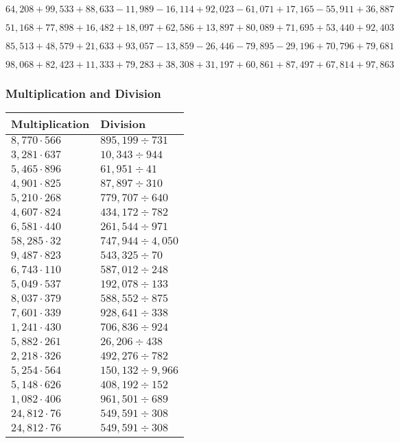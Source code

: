 \(64,208+99,533+88,633-11,989-16,114+92,023-61,071+17,165-55,911+36,887\)

\(51,168+77,898+16,482+18,097+62,586+13,897+80,089+71,695+53,440+92,403\)

\(85,513+48,579+21,633+93,057-13,859-26,446-79,895-29,196+70,796+79,681\)

\(98,068+82,423+11,333+79,283+38,308+31,197+60,861+87,497+67,814+97,863\)

\hypertarget{multiplication-and-division-1}{%
\subsubsection{Multiplication and
Division}\label{multiplication-and-division-1}}

\begin{longtable}[]{@{}ll@{}}
\toprule
Multiplication & Division\tabularnewline
\midrule
\endhead
\(8,770\cdot566\) & \(895,199÷731\)\tabularnewline
\(3,281\cdot637\) & \(10,343÷944\)\tabularnewline
\(5,465\cdot896\) & \(61,951÷41\)\tabularnewline
\(4,901\cdot825\) & \(87,897÷310\)\tabularnewline
\(5,210\cdot268\) & \(779,707÷640\)\tabularnewline
\(4,607\cdot824\) & \(434,172÷782\)\tabularnewline
\(6,581\cdot440\) & \(261,544÷971\)\tabularnewline
\(58,285\cdot32\) & \(747,944÷4,050\)\tabularnewline
\(9,487\cdot823\) & \(543,325÷70\)\tabularnewline
\(6,743\cdot110\) & \(587,012÷248\)\tabularnewline
\(5,049\cdot537\) & \(192,078÷133\)\tabularnewline
\(8,037\cdot379\) & \(588,552÷875\)\tabularnewline
\(7,601\cdot339\) & \(928,641÷338\)\tabularnewline
\(1,241\cdot430\) & \(706,836÷924\)\tabularnewline
\(5,882\cdot261\) & \(26,206÷438\)\tabularnewline
\(2,218\cdot326\) & \(492,276÷782\)\tabularnewline
\(5,254\cdot564\) & \(150,132÷9,966\)\tabularnewline
\(5,148\cdot626\) & \(408,192÷152\)\tabularnewline
\(1,082\cdot406\) & \(961,501÷689\)\tabularnewline
\(24,812\cdot76\) & \(549,591÷308\)\tabularnewline
\(24,812\cdot76\) & \(549,591÷308\)\tabularnewline
\bottomrule
\end{longtable}

